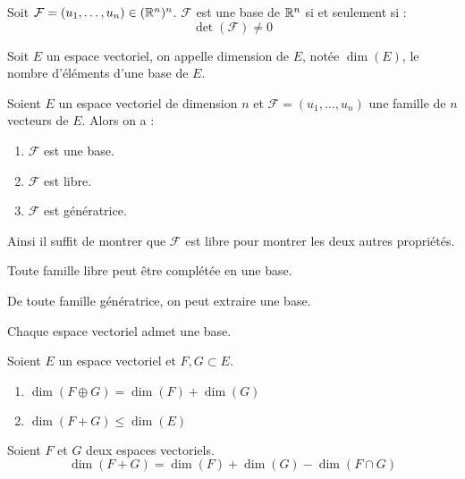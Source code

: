 \begin{proposition}
	Soit $\mathcal{F} = (u_1, \ldots, u_n) \in (\mathbb{R}^n)^n$. $\mathcal{F}$ est une base de $\mathbb{R}^n$ si et seulement si :
	\[ \det(\mathcal{F}) \neq 0 \]
\end{proposition}

\begin{definition}
	Soit $E$ un espace vectoriel, on appelle dimension de $E$, notée $\dim(E)$, le nombre d'éléments d'une base de $E$. 
\end{definition}


\begin{proposition}
	Soient $E$ un espace vectoriel de dimension $n$ et $\mathcal{F} = (u_1, \ldots, u_n)$ une famille de $n$ vecteurs de $E$. Alors on a :
	\begin{enumerate}
		\item $\mathcal{F}$ est une base.
		\item $\mathcal{F}$ est libre.
		\item $\mathcal{F}$ est génératrice.
	\end{enumerate}
	\noindent Ainsi il suffit de montrer que $\mathcal{F}$ est libre pour montrer les deux autres propriétés.
\end{proposition}

\begin{theorem}
	Toute famille libre peut être complétée en une base.
\end{theorem}

\begin{theorem}
    De toute famille génératrice, on peut extraire une base.
\end{theorem}

\begin{theorem}
    Chaque espace vectoriel admet une base.
\end{theorem}

\begin{proposition}
	Soient $E$ un espace vectoriel et $F, G\subset E$.
	\begin{multicols}{2}
	    \begin{enumerate}
    		\item $\dim(F \oplus G) = \dim(F) + \dim(G)$ 
    		\item $\dim(F + G) \leq \dim(E)$
    	\end{enumerate}
	\end{multicols}
\end{proposition}

\begin{theorem}
	Soient $F$ et $G$ deux espaces vectoriels.
	\[ \dim(F+G) = \dim(F) + \dim(G) - \dim(F\cap G) \]
\end{theorem}

